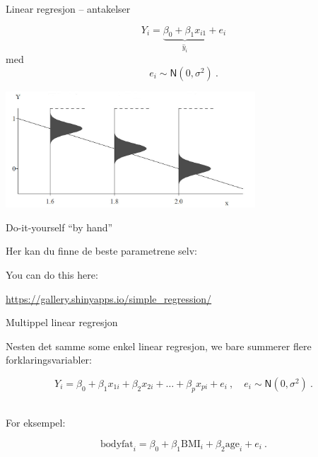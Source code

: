 \documentclass[10pt,ignorenonframetext,]{beamer}
\begin{document}
\begin{frame}{Linear regresjon -- antakelser}
\protect\hypertarget{linear-regresjon-antakelser}{}

\[Y_i = \underbrace{\beta_0 + \beta_1 x_{i1}}_{\hat{y}_i} + e_i\] med
\[e_i \sim \textsf{N}(0,\sigma^2) \ .\]

\centering

\includegraphics[width=0.7\textwidth,height=\textheight]{regrAssumptions.jpg}

\end{frame}

\begin{frame}

\begin{block}{Do-it-yourself ``by hand''}

\vspace{6mm}

Her kan du finne de beste parametrene selv: \vspace{2mm}

You can do this here: \vspace{2mm}

\url{https://gallery.shinyapps.io/simple_regression/}

\end{block}

\end{frame}

\begin{frame}{Multippel linear regresjon}
\protect\hypertarget{multippel-linear-regresjon}{}

Nesten det samme some enkel linear regresjon, we bare summerer flere
forklaringsvariabler:

\[Y_i = \beta_0 + \beta_1 x_{1i} + \beta_2 x_{2i} + \ldots + \beta_p x_{pi} + e_i \ , \quad e_i \sim\mathsf{N}(0,\sigma^2) \ .\]
\(~\)

For eksempel:

\[\text{bodyfat}_i = \beta_0 + \beta_1 \text{BMI}_i + \beta_2 \text{age}_i + e_i \ .\]

\end{frame}
\end{document}
